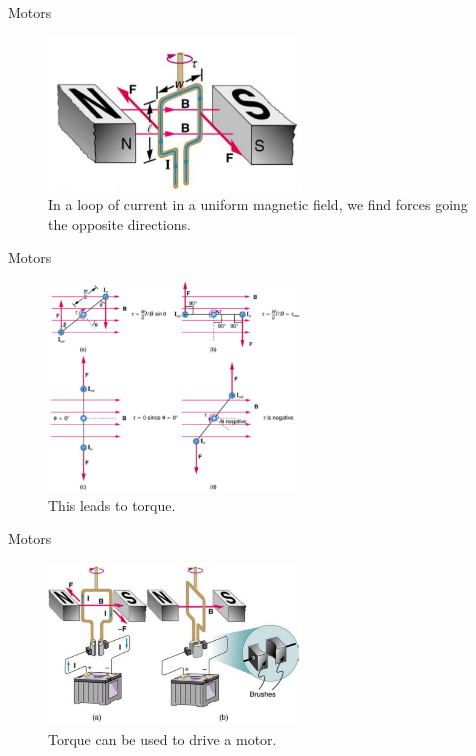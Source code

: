 \documentclass{beamer}
\begin{document}
\begin{frame}{Motors} 
\begin{figure}
\centering
\includegraphics[width=0.6\textwidth]{figures/loop.png}
\caption{\label{fig:loop} In a loop of current in a uniform magnetic field, we find forces going the opposite directions.}
\end{figure}
\end{frame}

\begin{frame}{Motors} 
\begin{figure}
\centering
\includegraphics[width=0.6\textwidth]{figures/torque.png}
\caption{\label{fig:loop2} This leads to torque.}
\end{figure}
\end{frame}

\begin{frame}{Motors} 
\begin{figure}
\centering
\includegraphics[width=0.6\textwidth]{figures/motor.png}
\caption{\label{fig:loop3} Torque can be used to drive a motor.}
\end{figure}
\end{frame}
\end{document}
